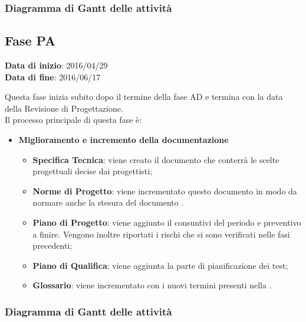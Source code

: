 		
		\subsubsection{Diagramma di Gantt delle attività}
		
	\subsection{Fase PA}
	\begin{center}
		\textbf{Data di inizio}: 2016/04/29 \\
		\textbf{Data di fine}: 2016/06/17 \\
	\end{center}
	Questa fase inizia subito dopo il termine della fase AD e termina con la data della Revisione di Progettazione. \\
	Il processo principale di questa fase è:
		\begin{itemize}
			\item \textbf{Miglioramento e incremento della documentazione}
			\att
			\begin{itemize}
				\item \textbf{Specifica Tecnica}: viene creato il documento \STdoc che conterrà le scelte progettuali decise dai progettisti;
				\item \textbf{Norme di Progetto}: viene incrementato questo documento in modo da normare anche la stesura del documento \STdoc.
				\item \textbf{Piano di Progetto}: viene aggiunto il consuntivi del periodo e preventivo a finire. Vengono inoltre riportati i rischi che si sono verificati nelle fasi precedenti;
				\item \textbf{Piano di Qualifica}: viene aggiunta la parte di pianificazione dei test;
				\item \textbf{Glossario}: viene incrementato con i nuovi termini presenti nella \STdoc.
			\end{itemize}
		\end{itemize}
		\subsubsection{Diagramma di Gantt delle attività}
		
		
		
